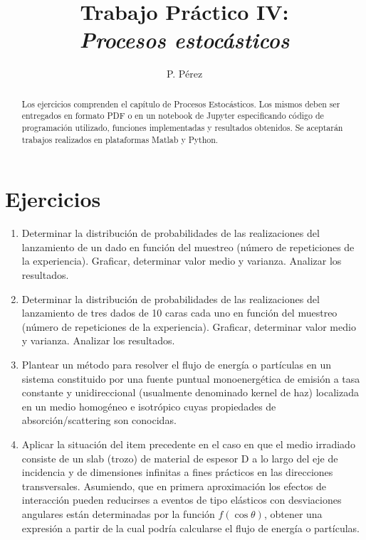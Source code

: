\documentclass[a4paper,10pt]{article}
\title{{\bf Trabajo Práctico IV:}\\ \emph{Procesos estocásticos}}
\author{P. Pérez}
\begin{document}
\maketitle

\begin{abstract}
Los ejercicios comprenden el capítulo de Procesos Estocásticos. Los mismos deben ser entregados en formato PDF o en un notebook de Jupyter especificando código de programación utilizado, funciones implementadas y resultados obtenidos. Se aceptarán trabajos realizados en plataformas Matlab y Python.
\end{abstract}

\section*{Ejercicios}

\begin{enumerate}
 \item  Determinar la distribución de probabilidades de las realizaciones del lanzamiento de un dado en función del muestreo (número de repeticiones de la experiencia). Graficar, determinar valor medio y varianza. Analizar los resultados.
 \item Determinar la distribución de probabilidades de las realizaciones del lanzamiento de tres dados de 10 caras cada uno en función del muestreo (número de repeticiones de la experiencia). Graficar, determinar valor medio y varianza. Analizar los resultados.
 \item Plantear un método para resolver el flujo de energía o partículas en un sistema constituido por una fuente puntual monoenergética de emisión a tasa constante y unidireccional (usualmente denominado kernel de haz) localizada en un medio homogéneo e isotrópico cuyas propiedades de absorción/scattering son conocidas.
 \item Aplicar la situación del item precedente en el caso en que el medio irradiado consiste de un slab (trozo) de material de espesor D a lo largo del eje de incidencia y de dimensiones infinitas a fines prácticos en las direcciones transversales. Asumiendo, que en primera aproximación los efectos de interacción pueden reducirses a eventos de tipo elásticos con desviaciones angulares están determinadas por la función $f(\cos{\theta})$, obtener una expresión a partir de la cual podría calcularse el flujo de energía o partículas.
 \end{enumerate}
\end{document}
